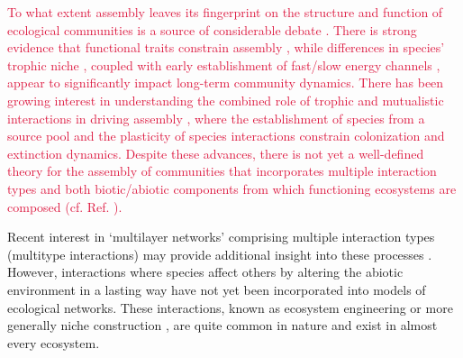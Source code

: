 \documentclass[twocolumn,preprintnumbers,amsmath,amssymb,superscriptaddress,linenumbers]{revtex4-1}
\newcommand{\rev}[1]{\textcolor{crimson}{#1}}
\begin{document}
\rev{To what extent assembly leaves its fingerprint on the structure and function of ecological communities is a source of considerable debate \cite{Hubbell2001,Tilman2004,Fukami2015}.
There is strong evidence that functional traits constrain assembly \cite{Kraft2008,ODwyer2009,Fukami2015}, while differences in species' trophic niche \cite{Brown2002,Piechnik2008}, coupled with early establishment of fast/slow energy channels \cite{Fahimipour2014}, appear to significantly impact long-term community dynamics.
There has been growing interest in understanding the combined role of trophic and mutualistic interactions in driving assembly \cite{Barbier2018,Campbell2011}, where the establishment of species from a source pool \cite{Luh1993,Law1996,Campbell2011} and the plasticity of species interactions \cite{Valdovinos2010,RamosJiliberto2012,Valdovinos2016,Ponisio2019} constrain colonization and extinction dynamics.
Despite these advances, there is not yet a well-defined theory for the assembly of communities that incorporates multiple interaction types and both biotic/abiotic components from which functioning ecosystems are composed (cf. Ref. \citenum{Odum1969}).
}

Recent interest in `multilayer networks' comprising multiple interaction types (multitype interactions) may provide additional insight into these processes \cite{Kefi2016,Pilosof2017}. 
However, interactions where species affect others by altering the abiotic environment in a lasting way have not yet been incorporated into models of ecological networks. 
These interactions, known as ecosystem engineering \cite{Lawton1994,OdlingSmee2013} or more generally niche construction \cite{OdlingSmee2013b,Fukami2015}, are quite common in nature and exist in almost every ecosystem.

\end{document}

